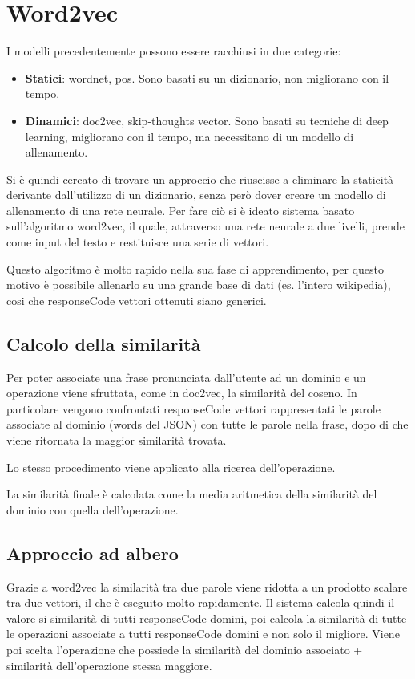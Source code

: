 \documentclass[twoside]{supsistudent}
\begin{document}
\section{Word2vec}
I modelli precedentemente possono essere racchiusi in due categorie:
\begin{itemize}
  \item \textbf{Statici}: wordnet, pos. Sono basati su un dizionario, non migliorano con il tempo.
  \item \textbf{Dinamici}: doc2vec, skip-thoughts vector. Sono basati su tecniche di deep learning, migliorano con il tempo, ma necessitano di un modello di allenamento.
\end{itemize}
Si è quindi cercato di trovare un approccio che riuscisse a eliminare la staticità derivante dall'utilizzo di un dizionario, senza però dover creare un modello di allenamento di una rete neurale.
Per fare ciò si è ideato sistema basato sull'algoritmo word2vec, il quale, attraverso una rete neurale a due livelli, prende come input del testo e restituisce una serie di vettori. 

Questo algoritmo è molto rapido nella sua fase di apprendimento, per questo motivo è possibile allenarlo su una grande base di dati (es. l'intero wikipedia), cosi che responseCode vettori ottenuti siano generici.\cite{word2vec}
\subsection{Calcolo della similarità}
Per poter associate una frase pronunciata dall'utente ad un dominio e un operazione viene sfruttata, come in doc2vec, la similarità del coseno. In particolare vengono confrontati responseCode vettori rappresentati le parole associate al dominio (words del JSON) con tutte le parole nella frase, dopo di che viene ritornata la maggior similarità trovata.

Lo stesso procedimento viene applicato alla ricerca dell'operazione. 

La similarità finale è calcolata come la media aritmetica della similarità del dominio con quella dell'operazione.
\subsection{Approccio ad albero}
Grazie a word2vec la similarità tra due parole viene ridotta a un prodotto scalare tra due vettori, il che è eseguito molto rapidamente. Il sistema calcola quindi il valore si similarità di tutti responseCode domini, poi calcola la similarità di tutte le operazioni associate a tutti responseCode domini e non solo il migliore. Viene poi scelta l'operazione che possiede la similarità del dominio associato + similarità dell'operazione stessa maggiore.
\end{document}
